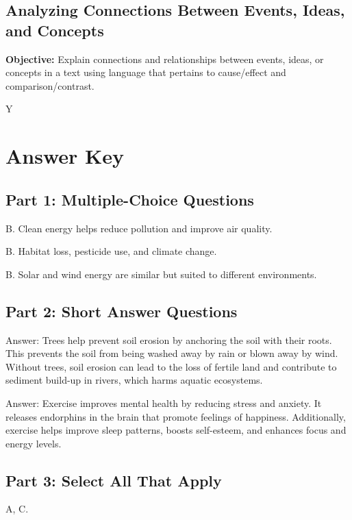 \documentclass[12pt]{article}
\begin{document}
\subsection*{Analyzing Connections Between Events, Ideas, and Concepts}
\onehalfspacing

\begin{tcolorbox}[colframe=black!40, colback=gray!0, title=Learning Objective]
\textbf{Objective:} Explain connections and relationships between events, ideas, or concepts in a text using language that pertains to cause/effect and comparison/contrast.
\end{tcolorbox}
Y
\section*{Answer Key}

\subsection*{Part 1: Multiple-Choice Questions}

B. Clean energy helps reduce pollution and improve air quality.

B. Habitat loss, pesticide use, and climate change.

B. Solar and wind energy are similar but suited to different environments.

\subsection*{Part 2: Short Answer Questions}

Answer: Trees help prevent soil erosion by anchoring the soil with their roots. This prevents the soil from being washed away by rain or blown away by wind. Without trees, soil erosion can lead to the loss of fertile land and contribute to sediment build-up in rivers, which harms aquatic ecosystems.

Answer: Exercise improves mental health by reducing stress and anxiety. It releases endorphins in the brain that promote feelings of happiness. Additionally, exercise helps improve sleep patterns, boosts self-esteem, and enhances focus and energy levels.

\subsection*{Part 3: Select All That Apply}

A, C.
\end{document}
